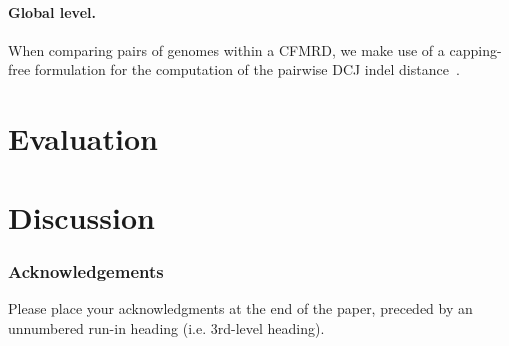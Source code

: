 \documentclass[runningheads]{llncs}
\begin{document}
\paragraph{Global level.}
When comparing pairs of genomes within a CFMRD, we make use of a capping-free formulation for the computation of the pairwise DCJ indel distance~\cite{BOH-2023}.





\section{Evaluation}
\section{Discussion}



\subsubsection{Acknowledgements} Please place your acknowledgments at
the end of the paper, preceded by an unnumbered run-in heading (i.e.
3rd-level heading).

%
%
%


\end{document}
